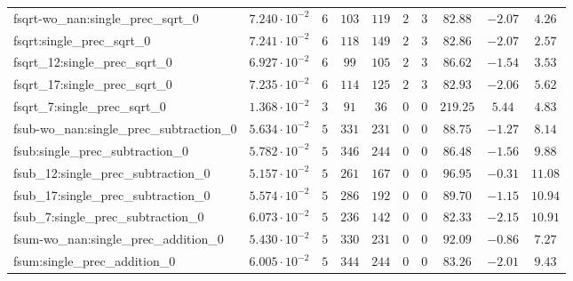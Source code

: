 \begin{tabular}{|l|c|c|c|c|c|c|c|c|c|}
fsqrt-wo\_nan:single\_prec\_sqrt\_0            & $ 7.240 \cdot 10^{-2} $ & $ 6      $ & $ 103    $ & $ 119   $ & $ 2   $ & $ 3  $ & $ 82.88       $ & $ -2.07   $ & $ 4.26    $ \\
fsqrt:single\_prec\_sqrt\_0                    & $ 7.241 \cdot 10^{-2} $ & $ 6      $ & $ 118    $ & $ 149   $ & $ 2   $ & $ 3  $ & $ 82.86       $ & $ -2.07   $ & $ 2.57    $ \\
fsqrt\_12:single\_prec\_sqrt\_0                & $ 6.927 \cdot 10^{-2} $ & $ 6      $ & $ 99     $ & $ 105   $ & $ 2   $ & $ 3  $ & $ 86.62       $ & $ -1.54   $ & $ 3.53    $ \\
fsqrt\_17:single\_prec\_sqrt\_0                & $ 7.235 \cdot 10^{-2} $ & $ 6      $ & $ 114    $ & $ 125   $ & $ 2   $ & $ 3  $ & $ 82.93       $ & $ -2.06   $ & $ 5.62    $ \\
fsqrt\_7:single\_prec\_sqrt\_0                 & $ 1.368 \cdot 10^{-2} $ & $ 3      $ & $ 91     $ & $ 36    $ & $ 0   $ & $ 0  $ & $ 219.25      $ & $ 5.44    $ & $ 4.83    $ \\
fsub-wo\_nan:single\_prec\_subtraction\_0      & $ 5.634 \cdot 10^{-2} $ & $ 5      $ & $ 331    $ & $ 231   $ & $ 0   $ & $ 0  $ & $ 88.75       $ & $ -1.27   $ & $ 8.14    $ \\
fsub:single\_prec\_subtraction\_0              & $ 5.782 \cdot 10^{-2} $ & $ 5      $ & $ 346    $ & $ 244   $ & $ 0   $ & $ 0  $ & $ 86.48       $ & $ -1.56   $ & $ 9.88    $ \\
fsub\_12:single\_prec\_subtraction\_0          & $ 5.157 \cdot 10^{-2} $ & $ 5      $ & $ 261    $ & $ 167   $ & $ 0   $ & $ 0  $ & $ 96.95       $ & $ -0.31   $ & $ 11.08   $ \\
fsub\_17:single\_prec\_subtraction\_0          & $ 5.574 \cdot 10^{-2} $ & $ 5      $ & $ 286    $ & $ 192   $ & $ 0   $ & $ 0  $ & $ 89.70       $ & $ -1.15   $ & $ 10.94   $ \\
fsub\_7:single\_prec\_subtraction\_0           & $ 6.073 \cdot 10^{-2} $ & $ 5      $ & $ 236    $ & $ 142   $ & $ 0   $ & $ 0  $ & $ 82.33       $ & $ -2.15   $ & $ 10.91   $ \\
fsum-wo\_nan:single\_prec\_addition\_0         & $ 5.430 \cdot 10^{-2} $ & $ 5      $ & $ 330    $ & $ 231   $ & $ 0   $ & $ 0  $ & $ 92.09       $ & $ -0.86   $ & $ 7.27    $ \\
fsum:single\_prec\_addition\_0                 & $ 6.005 \cdot 10^{-2} $ & $ 5      $ & $ 344    $ & $ 244   $ & $ 0   $ & $ 0  $ & $ 83.26       $ & $ -2.01   $ & $ 9.43    $ \\

\end{tabular}
